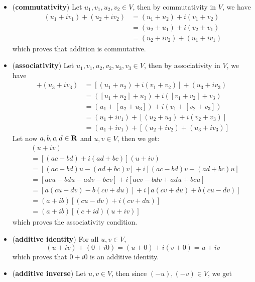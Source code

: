 \begin{solution}
    \begin{itemize}
        \item (\textbf{commutativity}) Let $u_1, v_1, u_2, v_2 \in V$, then by commutativity in $V$, we have
        \begin{align*}
            (u_1+iv_1) + (u_2 + iv_2) &= (u_1 + u_2) + i(v_1 + v_2) \\
            &= (u_2 + u_1) + i(v_2 + v_1) \\
            &= (u_2+iv_2) + (u_1 + iv_1)
        \end{align*}
        which proves that addition is commutative.
        \item (\textbf{associativity}) Let $u_1, v_1, u_2, v_2, u_3,v_3 \in V$, then by associativity in $V$, we have
        \begin{align*}
            [(u_1+iv_1) + (u_2 + iv_2)] + (u_3+iv_3) &= [(u_1 + u_2) + i(v_1 + v_2)] + (u_3+iv_3) \\
            &= ([u_1 + u_2] + u_3) + i([v_1 + v_2] + v_3) \\
            &= (u_1 + [u_2 + u_3]) + i(v_1 + [v_2 + v_3]) \\
            &= (u_1 + iv_1) + [(u_2 + u_3) + i(v_2 + v_3)] \\
            &= (u_1 + iv_1) + [(u_2 + iv_2) + (u_3 + iv_3)]
        \end{align*}
        Let now $a,b,c,d \in \mathbf{R}$ and $u,v \in V$, then we get:
        \begin{align*}
            [(a+bi)(c+di)]&(u+iv) \\ 
            &= [(ac - bd) + i(ad + bc)](u+iv) \\
            &= [(ac - bd)u - (ad+bc)v] + i [(ac - bd)v + (ad+bc)u] \\
            &= [acu - bdu - adv -bcv] + i [acv - bdv + adu+bcu] \\
            &= [a(cu - dv) - b(cv + du)] + i[a(cv + du) + b(cu - dv)] \\
            &= (a+ib)[(cu - dv)+i(cv+du)] \\
            &= (a+ib)[(c+id)(u+iv)]
        \end{align*}
        which proves the associativity condition.
        \item (\textbf{additive identity}) For all $u,v \in V$,
        $$(u + iv) + (0+i0) = (u+0) + i(v+0) = u + iv$$
        which proves that $0+i0$ is an additive identity.
        \item (\textbf{additive inverse}) Let $u,v \in V$, then since $(-u), (-v) \in V$, we get

\end{itemize}
\end{solution}
